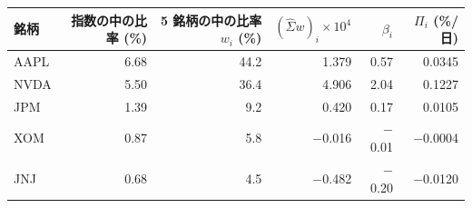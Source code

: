 \begin{tabular}{lrrrrr}
\toprule
銘柄 & 指数の中の比率 (\%) & 5 銘柄の中の比率 $w_i$ (\%) & $(\hat\Sigma w)_i \times 10^4$ & $\beta_i$ & $\Pi_i$ (\%/日) \\
\midrule
AAPL & 6.68 & 44.2 & 1.379 & 0.57 & 0.0345 \\
NVDA & 5.50 & 36.4 & 4.906 & 2.04 & 0.1227 \\
JPM & 1.39 & 9.2 & 0.420 & 0.17 & 0.0105 \\
XOM & 0.87 & 5.8 & \ensuremath{-}0.016 & \ensuremath{-}0.01 & \ensuremath{-}0.0004 \\
JNJ & 0.68 & 4.5 & \ensuremath{-}0.482 & \ensuremath{-}0.20 & \ensuremath{-}0.0120 \\
\bottomrule
\end{tabular}
